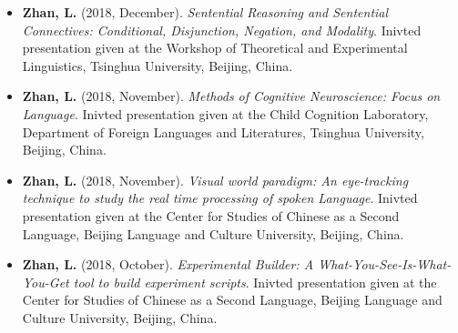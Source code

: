 \documentclass[12pt,]{article}
\begin{document}
\begin{itemize}
\item
  \textbf{Zhan, L.} (2018, December). \emph{Sentential Reasoning and
  Sentential Connectives: Conditional, Disjunction, Negation, and
  Modality}. Inivted presentation given at the Workshop of Theoretical
  and Experimental Linguistics, Tsinghua University, Beijing, China.
  \href{https://publications.likan.info/Talks/Sentential_Reasoning_Sentential_Connectives.pdf}{
  \faFilePdf[regular] }
\item
  \textbf{Zhan, L.} (2018, November). \emph{Methods of Cognitive
  Neuroscience: Focus on Language}. Inivted presentation given at the
  Child Cognition Laboratory, Department of Foreign Languages and
  Literatures, Tsinghua University, Beijing, China.
  \href{https://publications.likan.info/Talks/MethodsCognNeurosciLang2018NOV.pdf}{
  \faFilePdf[regular] }
\item
  \textbf{Zhan, L.} (2018, November). \emph{Visual world paradigm: An
  eye-tracking technique to study the real time processing of spoken
  Language}. Inivted presentation given at the Center for Studies of
  Chinese as a Second Language, Beijing Language and Culture University,
  Beijing, China.
  \href{https://publications.likan.info/Talks/Visual_World_Paradigm.pdf}{
  \faFilePdf[regular] }
\item
  \textbf{Zhan, L.} (2018, October). \emph{Experimental Builder: A
  What-You-See-Is-What-You-Get tool to build experiment scripts}.
  Inivted presentation given at the Center for Studies of Chinese as a
  Second Language, Beijing Language and Culture University, Beijing,
  China.
  \href{https://publications.likan.info/Eyelink_Experiment_Builder_Training_Materials/}{
  \faFilePdf[regular] }
\end{itemize}
\end{document}
